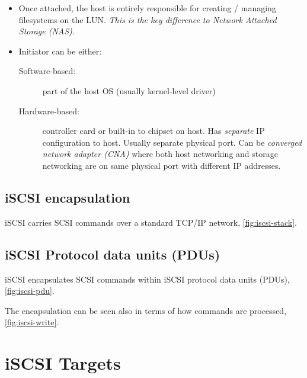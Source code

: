\begin{itemize}
\item
  Once attached, the host is entirely responsible for creating /
  managing filesystems on the LUN. \emph{This is the key difference to
  Network Attached Storage (NAS).}
\item
  Initiator can be either:

  \begin{description}
  \item[Software-based:]
  part of the host OS (usually kernel-level driver)
  \item[Hardware-based:]
  controller card or built-in to chipset on host. Has \emph{separate} IP
  configuration to host. Usually separate physical port. Can be
  \emph{converged network adapter (CNA)} where both host networking and
  storage networking are on same physical port with different IP
  addresses.
  \end{description}
\end{itemize}


\subsection{iSCSI encapsulation}
\label{sec:encapsulation}

iSCSI carries SCSI commands over a standard TCP/IP network, \autoref{fig:iscsi-stack}.


\subsection{iSCSI Protocol data units (PDUs)}
\label{sec:iscsi-pdu}

iSCSI encapsulates SCSI commands within iSCSI protocol data units
(PDUs), \autoref{fig:iscsi-pdu}.


The encapsulation can be seen also in terms of how commands are processed, \autoref{fig:iscsi-write}.


\section{iSCSI Targets}
\label{sec:iscsi-targets}

